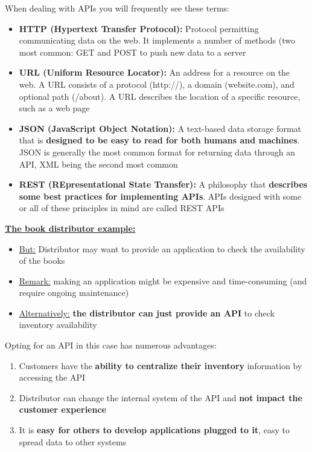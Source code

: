 \documentclass{beamer}[10pt, usepdftitle=false handout]
\begin{document}
		
	\begin{frame}

	When dealing with APIs you will frequently see these terms: 
\vspace*{0.6em}

	\begin{itemize}
	\item{\textbf{HTTP (Hypertext Transfer Protocol):} Protocol permitting communicating data on the web. It implements a number of methods (two most common: GET and POST to push new data to a server}
	\item{\textbf{URL (Uniform Resource Locator):} An address for a resource on the web. A URL consists of a protocol (http://), a domain (website.com), and optional path (/about). A URL describes the location of a specific resource, such as a web page}
	\item{\textbf{JSON (JavaScript Object Notation):} A text-based data storage format that is \textbf{designed to be easy to read for both humans and machines}. JSON is generally the most common format for returning data through an API, XML being the second most common}
	\item{\textbf{REST (REpresentational State Transfer):} A philosophy that \textbf{describes some best practices for implementing APIs}. APIs designed with some or all of these principles in mind are called REST APIs}	
	\end{itemize}

	\end{frame}
	
	\begin{frame}
	
	\underline{\textbf{The book distributor example:}}
	\vspace*{0.6em}	
	
	\begin{itemize}
	\item{\underline{But:} Distributor may want to provide an application to check the availability of the books}	
	\item{\underline{Remark:} making an application might be expensive and time-consuming (and require ongoing maintenance)}
	\item{\underline{Alternatively:} \textbf{the distributor can just provide an API} to check inventory availability}
	\end{itemize}		
	
	Opting for an API in this case has numerous advantages:
\vspace*{0.6em}

\begin{enumerate}
\item{Customers have the \textbf{ability to centralize their inventory} information by accessing the API}
\item{Distributor can change the internal system of the API and \textbf{not impact the customer experience}}
\item{It is \textbf{easy for others to develop applications plugged to it}, easy to spread data to other systems}
\end{enumerate}

	\end{frame}	
\end{document}
